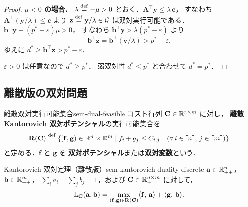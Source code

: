 \begin{proof}
  \textbf{$\mu < 0$ の場合．}
  $\lambda \overset{\mathrm{def}}{=} -\mu > 0$ とおく．$\mathbf{A}^\top \mathbf{y} \leq \lambda\,\mathbf{c}$，
  すなわち $\mathbf{A}^\top (\mathbf{y}/\lambda) \leq \mathbf{c}$ より
  $\mathbf{z} \overset{\mathrm{def}}{=} \mathbf{y}/\lambda \in \mathcal{G}$ は双対実行可能である．
  $\mathbf{b}^\top \mathbf{y} + (p^* - \varepsilon)\mu > 0$，
  すなわち $\mathbf{b}^\top \mathbf{y} > \lambda(p^* - \varepsilon)$ より
  \[
    \mathbf{b}^\top \mathbf{z}
    = \mathbf{b}^\top (\mathbf{y}/\lambda)
    > p^* - \varepsilon.
  \]
  ゆえに $d^* \geq \mathbf{b}^\top \mathbf{z} > p^* - \varepsilon$．

  $\varepsilon > 0$ は任意なので $d^* \geq p^*$．
  弱双対性 $d^* \leq p^*$ と合わせて $d^* = p^*$．
\end{proof}

\subsection{離散版の双対問題}

\begin{definition}{離散双対実行可能集合}{sem-dual-feasible}
  コスト行列 $\mathbf{C} \in \mathbb{R}^{n \times m}$ に対し，
  \textbf{離散 Kantorovich 双対ポテンシャル}の実行可能集合を
  \[
    \mathbf{R}(\mathbf{C})
    \overset{\mathrm{def}}{=}
    \left\{(\mathbf{f}, \mathbf{g}) \in \mathbb{R}^n \times \mathbb{R}^m
    \;\middle|\;
    f_i + g_j \leq C_{i,j}
    \quad(\forall\, i \in \llbracket n \rrbracket,\, j \in \llbracket m \rrbracket)
    \right\}
  \]
  と定める．$\mathbf{f}$ と $\mathbf{g}$ を
  \textbf{双対ポテンシャル}または\textbf{双対変数}という．
\end{definition}

\begin{theorem}{Kantorovich 双対定理（離散版）}{sem-kantorovich-duality-discrete}
  $\mathbf{a} \in \mathbb{R}_{++}^n$，$\mathbf{b} \in \mathbb{R}_{++}^m$，
  $\sum_i a_i = \sum_j b_j = 1$，および
  $\mathbf{C} \in \mathbb{R}_+^{n \times m}$ に対して，
  \[
    \mathrm{L}_{\mathbf{C}}(\mathbf{a}, \mathbf{b})
    =
    \max_{(\mathbf{f}, \mathbf{g}) \in \mathbf{R}(\mathbf{C})}
    \langle \mathbf{f},\, \mathbf{a} \rangle + \langle \mathbf{g},\, \mathbf{b} \rangle.
  \]
\end{theorem}


